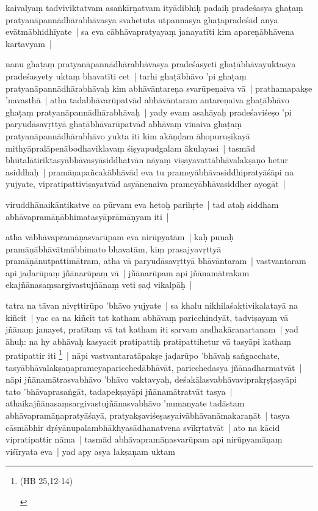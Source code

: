 \documentclass[article,a4paper]{memoir}
\begin{document}
	  \pstart kaivalyaṃ tadviviktatvam asaṅkī\-rṇatvam ityā\-dibhiḥ padaiḥ pradeśasya ghaṭaṃ pratyanā\-pannā\-dhā\-rabhā\-vasya svahetuta utpannasya ghaṭapradeśā\-d anya evā\-tmā\-bhidhī\-yate | sa eva cā\-bhā\-vapratyayaṃ janayatī\-ti kim apareṇā\-bhā\-vena kartavyam |
	\pend
      

	  \pstart nanu ghaṭaṃ pratyanā\-pannā\-dhā\-rabhā\-vasya pradeśasyeti ghaṭā\-bhā\-vayuktasya pradeśasyety uktaṃ bhavatī\-ti cet | tarhi ghaṭā\-bhā\-vo 'pi ghaṭaṃ pratyanā\-pannā\-dhā\-rabhā\-vaḥ kim abhā\-vā\-ntareṇa svarū\-peṇaiva vā\- | prathamapakṣe 'navasthā\- | atha tadabhā\-varū\-patvā\-d abhā\-vā\-ntaram antareṇaiva ghaṭā\-bhā\-vo ghaṭaṃ pratyanā\-pannā\-dhā\-rabhā\-vaḥ | yady evam asahā\-yaḥ pradeśaviśeṣo 'pi paryudā\-savṛttyā\- ghaṭā\-bhā\-varū\-patvā\-d abhā\-vaṃ vinaiva ghaṭaṃ pratyanā\-pannā\-dhā\-rabhā\-vo yukta iti kim akā\-ṇḍam ā\-hopuruṣikayā\- mithyā\-pralā\-penā\-bodhaviklavaṃ śiṣyapudgalam ā\-kulayasi | tasmā\-d bhū\-talā\-tiriktasyā\-bhā\-vasyā\-siddhatvā\-n nā\-yaṃ viṣayavattā\-bhā\-valakṣaṇo hetur asiddhaḥ | pramā\-ṇapañcakā\-bhā\-vā\-d eva tu prameyā\-bhā\-vasiddhipratyā\-śā\-pi na yujyate, vipratipattiviṣayatvā\-d asyā\-nenaiva prameyā\-bhā\-vasiddher ayogā\-t |
	\pend
      

	  \pstart viruddhā\-naikā\-ntikatve ca pū\-rvam eva hetoḥ parihṛte | tad ataḥ siddham abhā\-vapramā\-ṇā\-bhimatasyā\-prā\-mā\-ṇyam iti |
	\pend
      

	  \pstart atha vā\-bhā\-vapramā\-ṇasvarū\-pam eva nirū\-pyatā\-m | kaḥ punaḥ pramā\-ṇā\-bhā\-vā\-tmā\-bhimato bhavatā\-m, kiṃ prasajyavṛttyā\- pramā\-ṇā\-nutpattimā\-tram, atha vā\- paryudā\-savṛttyā\- bhā\-vā\-ntaram | vastvantaram api jaḍarū\-paṃ jñā\-narū\-paṃ vā\- | jñā\-narū\-pam api jñā\-namā\-trakam ekajñā\-nasaṃsargivastujñā\-naṃ veti ṣaḍ vikalpā\-ḥ |
	\pend
      

	  \pstart tatra na tā\-van nivṛttirū\-po 'bhā\-vo yujyate | sa khalu nikhilaśaktivikalatayā\- na kiñcit | yac ca na kiñcit tat katham abhā\-vaṃ paricchindyā\-t, tadviṣayaṃ vā\- jñā\-naṃ janayet, pratī\-taṃ vā\- tat katham iti sarvam andhakā\-ranartanam | yad ā\-huḥ: na hy abhā\-vaḥ kasyacit pratipattiḥ pratipattihetur vā\- tasyā\-pi kathaṃ pratipattir iti \footnote{\begin{english}(HB 25,12-14)\end{english}} | nā\-pi vastvantaratā\-pakṣe jaḍarū\-po 'bhā\-vaḥ saṅgacchate, tasyā\-bhā\-valakṣaṇaprameyaparicchedā\-bhā\-vā\-t, paricchedasya jñā\-nadharmatvā\-t | nā\-pi jñā\-namā\-trasvabhā\-vo 'bhā\-vo vaktavyaḥ, deśakā\-lasvabhā\-vaviprakṛṣṭasyā\-pi tato 'bhā\-vaprasaṅgā\-t, tadapekṣayā\-pi jñā\-namā\-tratvā\-t tasya | athaikajñā\-nasaṃsargivastujñā\-nasvabhā\-vo 'numanyate tadā\-stam abhā\-vapramā\-ṇapratyā\-śayā\-, pratyakṣaviśeṣasyaivā\-bhā\-vanā\-makaraṇā\-t | tasya cā\-smā\-bhir dṛśyā\-nupalambhā\-khyasā\-dhanatvena svī\-kṛtatvā\-t | ato na kā\-cid vipratipattir nā\-ma | tasmā\-d abhā\-vapramā\-ṇasvarū\-pam api nirū\-pyamā\-ṇaṃ viśī\-ryata eva | yad apy asya lakṣaṇam uktam
	\pend
      
\end{document}

